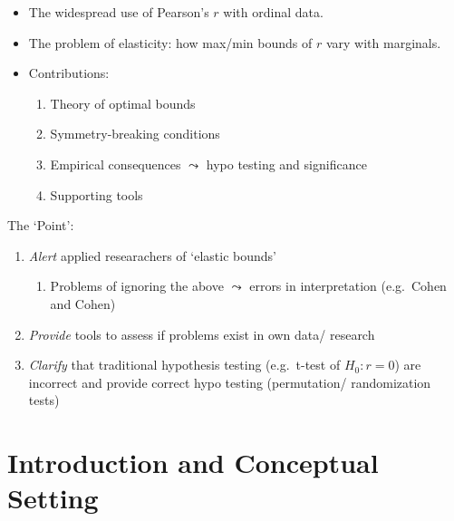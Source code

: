 \documentclass[
  12pt,
]{article}
\providecommand{\tightlist}{%
  \setlength{\itemsep}{0pt}\setlength{\parskip}{0pt}}\usepackage{longtable,booktabs,array}
\theoremstyle{plain}
\theoremstyle{definition}
\theoremstyle{remark}
\begin{document}
\begin{itemize}
\item
  The widespread use of Pearson's \(r\) with ordinal data.\\
\item
  The problem of elasticity: how max/min bounds of \(r\) vary with
  marginals.\\
\item
  Contributions:

  \begin{enumerate}
  \def\labelenumi{\arabic{enumi}.}
  \tightlist
  \item
    Theory of optimal bounds\\
  \item
    Symmetry-breaking conditions\\
  \item
    Empirical consequences \(\leadsto\) hypo testing and significance
  \item
    Supporting tools
  \end{enumerate}
\end{itemize}

The `Point':

\begin{enumerate}
\def\labelenumi{\arabic{enumi}.}
\tightlist
\item
  \emph{Alert} applied researachers of `elastic bounds'

  \begin{enumerate}
  \def\labelenumii{\arabic{enumii}.}
  \tightlist
  \item
    Problems of ignoring the above \(\leadsto\) errors in interpretation
    (e.g.~Cohen and Cohen)
  \end{enumerate}
\item
  \emph{Provide} tools to assess if problems exist in own data/ research
\item
  \emph{Clarify} that traditional hypothesis testing (e.g.~t-test of
  \(H_0: r= 0\)) are incorrect and provide correct hypo testing
  (permutation/ randomization tests)
\end{enumerate}

\section{Introduction and Conceptual
Setting}\label{introduction-and-conceptual-setting}
\end{document}
